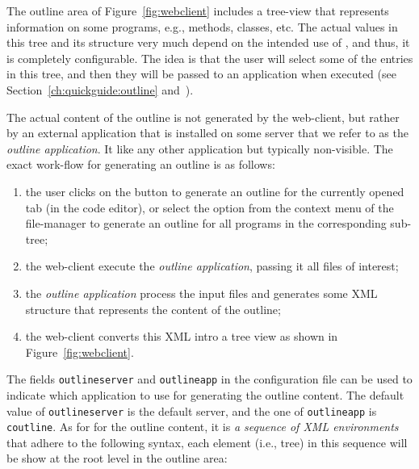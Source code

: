 The outline area of Figure~\ref{fig:webclient} includes a tree-view
that represents information on some programs, e.g., methods, classes,
etc. The actual values in this tree and its structure very much depend
on the intended use of \ei, and thus, it is completely configurable.
%
The idea is that the user will select some of the entries in this
tree, and then they will be passed to an application when executed
(see Section~\ref{ch:quickguide:outline}
and~).

The actual content of the outline is not generated by the web-client,
but rather by an external application that is installed on some \ei
server that we refer to as the \emph{outline application}. It like any
other application but typically non-visible.  The exact work-flow for
generating an outline is as follows:
%
\begin{enumerate}

\item the user clicks on the  button to generate an
  outline for the currently opened tab (in the code editor), or select
  the  option from the context menu of the file-manager
  to generate an outline for all programs in the corresponding
  sub-tree;

\item the web-client execute the \emph{outline application}, passing
  it all files of interest;

\item the \emph{outline application} process the input files and
  generates some XML structure that represents the content of the
  outline;

\item the web-client converts this XML intro a tree view as shown in
  Figure~\ref{fig:webclient}.

\end{enumerate}
%
The fields \texttt{outlineserver} and \texttt{outlineapp} in the
configuration file can be used to indicate which application to use
for generating the outline content. The default value of
\texttt{outlineserver} is the default server, and the one of
\texttt{outlineapp} is \texttt{coutline}. As for for the outline
content, it is \emph{a sequence of XML environments} that adhere to
the following syntax, each element (i.e., tree) in this sequence will
be show at the root level in the outline area:

